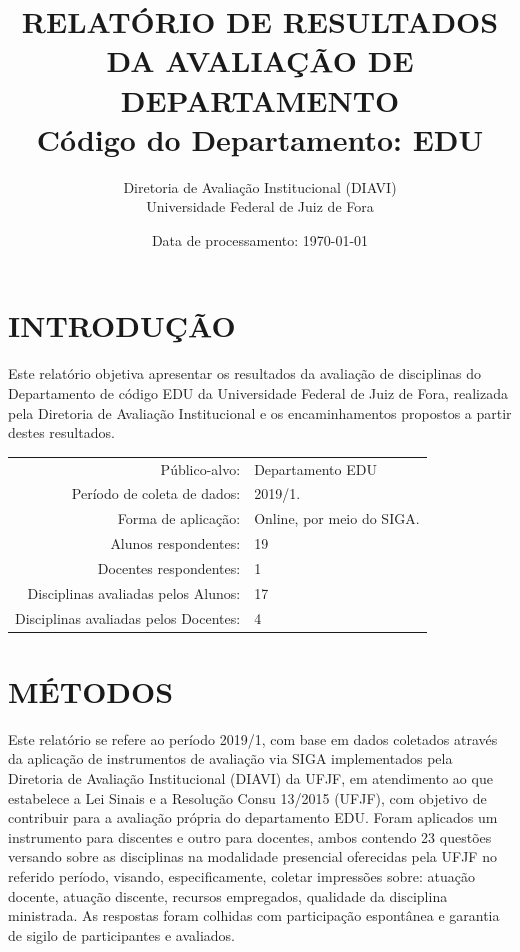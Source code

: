 \documentclass[a4paper,10pt]{article}
\date{Data de processamento: \today}
\begin{document}
\author{Diretoria de Avaliação Institucional (DIAVI) \\ Universidade Federal de Juiz de Fora}

\title{RELATÓRIO DE RESULTADOS DA AVALIAÇÃO DE DEPARTAMENTO\\ Código do Departamento: EDU}
\maketitle
\section{INTRODUÇÃO}
Este relatório objetiva apresentar os resultados da avaliação de disciplinas do Departamento     de código EDU da Universidade Federal de Juiz de Fora, realizada pela     Diretoria de Avaliação Institucional e os encaminhamentos propostos a     partir destes resultados.

\begin{center}
\begin{tabularx}{\linewidth}{r|X}

Público-alvo:& Departamento  EDU\\

Período de coleta de dados:& 2019/1.\\

Forma de aplicação:& Online, por meio do SIGA.\\

Alunos   respondentes:& 19\\

Docentes respondentes:& 1\\

Disciplinas avaliadas pelos   Alunos:& 17\\

Disciplinas avaliadas pelos Docentes:& 4\\
\end{tabularx}
\end{center}

\section{MÉTODOS}
Este relatório se refere ao período 2019/1, com base em dados     coletados através da aplicação de instrumentos de avaliação via SIGA     implementados pela Diretoria de Avaliação Institucional (DIAVI) da UFJF, em atendimento     ao que estabelece a Lei Sinais e a Resolução Consu 13/2015 (UFJF),     com objetivo de contribuir para a avaliação própria do departamento EDU.    Foram aplicados um instrumento para discentes e outro para docentes, ambos contendo     23 questões versando sobre as disciplinas na modalidade presencial oferecidas pela UFJF no     referido período, visando, especificamente, coletar impressões sobre: atuação docente, atuação discente,     recursos empregados, qualidade da disciplina ministrada.     As respostas foram colhidas      com participação espontânea e garantia de    sigilo de participantes e avaliados.
\end{document}
